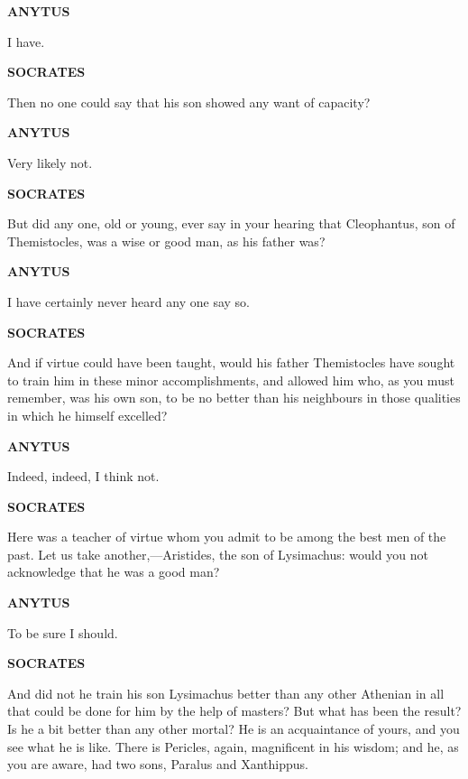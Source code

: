 \documentclass[11pt,letter]{article}
\begin{document}
\par \textbf{ANYTUS}
\par   I have.

\par \textbf{SOCRATES}
\par   Then no one could say that his son showed any want of capacity?

\par \textbf{ANYTUS}
\par   Very likely not.

\par \textbf{SOCRATES}
\par   But did any one, old or young, ever say in your hearing that Cleophantus, son of Themistocles, was a wise or good man, as his father was?

\par \textbf{ANYTUS}
\par   I have certainly never heard any one say so.

\par \textbf{SOCRATES}
\par   And if virtue could have been taught, would his father Themistocles have sought to train him in these minor accomplishments, and allowed him who, as you must remember, was his own son, to be no better than his neighbours in those qualities in which he himself excelled?

\par \textbf{ANYTUS}
\par   Indeed, indeed, I think not.

\par \textbf{SOCRATES}
\par   Here was a teacher of virtue whom you admit to be among the best men of the past. Let us take another,—Aristides, the son of Lysimachus:  would you not acknowledge that he was a good man?

\par \textbf{ANYTUS}
\par   To be sure I should.

\par \textbf{SOCRATES}
\par   And did not he train his son Lysimachus better than any other Athenian in all that could be done for him by the help of masters? But what has been the result? Is he a bit better than any other mortal? He is an acquaintance of yours, and you see what he is like. There is Pericles, again, magnificent in his wisdom; and he, as you are aware, had two sons, Paralus and Xanthippus.
\end{document}
